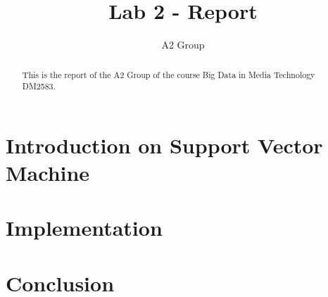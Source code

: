 \documentclass[a4paper]{article}
\title{Lab 2 - Report}
\author{A2 Group}
\begin{document}
\maketitle

\begin{abstract}
This is the report of the A2 Group of the course Big Data in Media Technology DM2583.
\end{abstract}

\section{Introduction on Support Vector Machine}


\section{Implementation}



\section{Conclusion}





\end{document}
